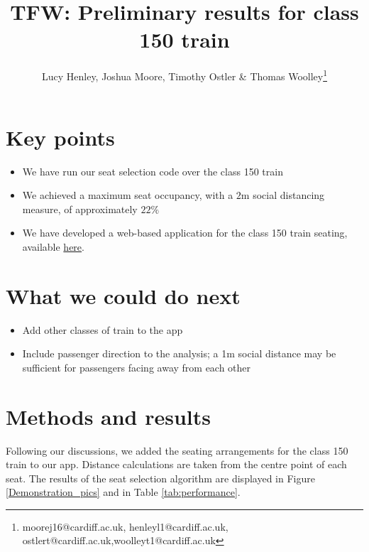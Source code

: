 \documentclass[11pt,a4paper]{article}
\title{TFW: Preliminary results for class 150 train}
\author{Lucy Henley, Joshua Moore, Timothy Ostler \& Thomas Woolley\footnote{moorej16@cardiff.ac.uk, henleyl1@cardiff.ac.uk, ostlert@cardiff.ac.uk,woolleyt1@cardiff.ac.uk}}
\begin{document}
\maketitle

\section*{Key points}
\begin{itemize}
\item We have run our seat selection code over the class 150 train
\item We achieved a maximum seat occupancy, with a $2$m social distancing measure, of approximately $22\%$
\item We have developed a web-based application for the class 150 train seating, available \href{https://lucyhenley.shinyapps.io/TFW_socialdistancing/}{here}.
\end{itemize}

\section*{What we could do next}
\begin{itemize}
\item Add other classes of train to the app
\item Include passenger direction to the analysis; a 1m social distance may be sufficient for passengers facing away from each other
\end{itemize}



\section*{Methods and results}
Following our discussions, we added the seating arrangements for the class 150 train to our app. Distance calculations are taken from the centre point of each seat. The results of the seat selection algorithm are displayed in Figure \ref{Demonstration_pics} and in Table \ref{tab:performance}.
\end{document}
